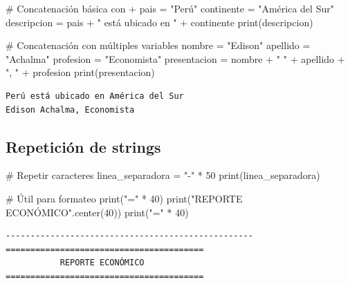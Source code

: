 \documentclass[
  doc,
  floatsintext,
  longtable,
  a4paper,
  nolmodern,
  notxfonts,
  notimes,
  12pt,
  colorlinks=true,linkcolor=blue,citecolor=blue,urlcolor=blue]{apa7}
\newenvironment{Shaded}{\begin{snugshade}}{\end{snugshade}}
\newcommand{\BuiltInTok}[1]{\textcolor[rgb]{0.00,0.23,0.31}{#1}}
\newcommand{\CommentTok}[1]{\textcolor[rgb]{0.37,0.37,0.37}{#1}}
\newcommand{\DecValTok}[1]{\textcolor[rgb]{0.68,0.00,0.00}{#1}}
\newcommand{\NormalTok}[1]{\textcolor[rgb]{0.00,0.23,0.31}{#1}}
\newcommand{\OperatorTok}[1]{\textcolor[rgb]{0.37,0.37,0.37}{#1}}
\newcommand{\StringTok}[1]{\textcolor[rgb]{0.13,0.47,0.30}{#1}}
\begin{document}
\begin{Shaded}
\begin{Highlighting}[]
\CommentTok{\# Concatenación básica con +}
\NormalTok{pais }\OperatorTok{=} \StringTok{"Perú"}
\NormalTok{continente }\OperatorTok{=} \StringTok{"América del Sur"}
\NormalTok{descripcion }\OperatorTok{=}\NormalTok{ pais }\OperatorTok{+} \StringTok{" está ubicado en "} \OperatorTok{+}\NormalTok{ continente}
\BuiltInTok{print}\NormalTok{(descripcion)}

\CommentTok{\# Concatenación con múltiples variables}
\NormalTok{nombre }\OperatorTok{=} \StringTok{"Edison"}
\NormalTok{apellido }\OperatorTok{=} \StringTok{"Achalma"}
\NormalTok{profesion }\OperatorTok{=} \StringTok{"Economista"}
\NormalTok{presentacion }\OperatorTok{=}\NormalTok{ nombre }\OperatorTok{+} \StringTok{" "} \OperatorTok{+}\NormalTok{ apellido }\OperatorTok{+} \StringTok{", "} \OperatorTok{+}\NormalTok{ profesion}
\BuiltInTok{print}\NormalTok{(presentacion)}
\end{Highlighting}
\end{Shaded}

\begin{verbatim}
Perú está ubicado en América del Sur
Edison Achalma, Economista
\end{verbatim}

\subsection{Repetición de strings}\label{repeticiuxf3n-de-strings}

\begin{Shaded}
\begin{Highlighting}[]
\CommentTok{\# Repetir caracteres}
\NormalTok{linea\_separadora }\OperatorTok{=} \StringTok{"{-}"} \OperatorTok{*} \DecValTok{50}
\BuiltInTok{print}\NormalTok{(linea\_separadora)}

\CommentTok{\# Útil para formateo}
\BuiltInTok{print}\NormalTok{(}\StringTok{"="} \OperatorTok{*} \DecValTok{40}\NormalTok{)}
\BuiltInTok{print}\NormalTok{(}\StringTok{"REPORTE ECONÓMICO"}\NormalTok{.center(}\DecValTok{40}\NormalTok{))}
\BuiltInTok{print}\NormalTok{(}\StringTok{"="} \OperatorTok{*} \DecValTok{40}\NormalTok{)}
\end{Highlighting}
\end{Shaded}

\begin{verbatim}
--------------------------------------------------
========================================
           REPORTE ECONÓMICO            
========================================
\end{verbatim}
\end{document}
